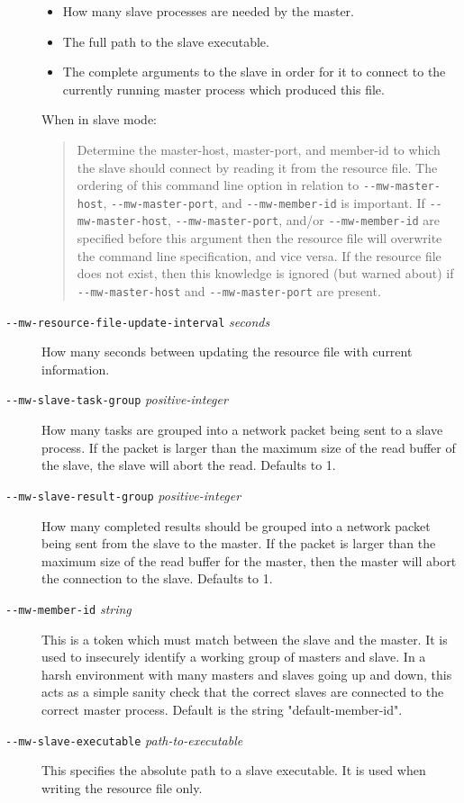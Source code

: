\documentclass[titlepage,12pt]{book}
\newcommand{\dash}{\texttt{-}}
\newcommand{\Option}[1]{\dash\dash\texttt{#1}}
\newcommand{\OptionV}[2]{\dash\dash\texttt{#1} \textit{#2}}
\begin{document}
\begin{description}
\begin{itemize}
		\item How many slave processes are needed by the master.
		\item The full path to the slave executable.
		\item The complete arguments to the slave in order for it to
			connect to the currently running master process which 
			produced this file.
    \end{itemize}
    When in slave mode:
	\begin{quotation}
      Determine the master-host, master-port, and member-id to which
      the slave should connect by reading it from the resource file.
      The ordering of this command line option in relation to
      \Option{mw-master-host}, \Option{mw-master-port}, and 
	  \Option{mw-member-id} is
      important. If \Option{mw-master-host}, \Option{mw-master-port}, and/or
      \Option{mw-member-id} are specified before this argument then the
      resource file will overwrite the command line specification,
      and vice versa. If the resource file does not exist, then this
      knowledge is ignored (but warned about) if \Option{mw-master-host}
      and \Option{mw-master-port} are present.
	\end{quotation}
\item[\OptionV{mw-resource-file-update-interval}{seconds}]
    How many seconds between updating the resource file with current
    information.
\item[\OptionV{mw-slave-task-group}{positive-integer}]
    How many tasks are grouped into a network packet being sent
    to a slave process. If the packet is larger than the maximum
    size of the read buffer of the slave, the slave will abort the
    read. Defaults to 1.
\item[\OptionV{mw-slave-result-group}{positive-integer}]
    How many completed results should be grouped into a network packet
    being sent from the slave to the master. If the packet is larger than the
    maximum size of the read buffer for the master, then the master will
    abort the connection to the slave. Defaults to 1.
\item[\OptionV{mw-member-id}{string}]
    This is a token which must match between the slave and the master. It is
    used to insecurely identify a working group of masters and slave. In a
    harsh environment with many masters and slaves going up and down, this
    acts as a simple sanity check that the correct slaves are connected to the
    correct master process. Default is the string "default-member-id".
\item[\OptionV{mw-slave-executable}{path-to-executable}]
    This specifies the absolute path to a slave executable. It is used
    when writing the resource file only.
\end{description}
\end{document}
